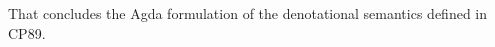 \begin{AgdaAlign}
\begin{code}
\AgdaSpace{}%
\AgdaSpace{}%
\AgdaSymbol{)}\AgdaSpace{}%
\AgdaOperator{\AgdaFunction{]?}}\AgdaSpace{}%
\AgdaSymbol{(}\AgdaSpace{}%
\AgdaSpace{}%
\AgdaSymbol{)}\<%
\\
%
\\[\AgdaEmptyExtraSkip]%
%
\>[2]\AgdaSpace{}%
\AgdaSymbol{:}\AgdaSpace{}%
\AgdaSpace{}%
\AgdaSpace{}%
\<%
\\
%
\>[2]\AgdaSpace{}%
\AgdaSymbol{(}\AgdaSpace{}%
\AgdaSpace{}%
\AgdaSymbol{)}%
\>[19]\AgdaSymbol{=}\AgdaSpace{}%
\AgdaSpace{}%
\AgdaSymbol{(}\AgdaSpace{}%
\AgdaSpace{}%
\AgdaSymbol{)}\AgdaSpace{}%
\AgdaSpace{}%
\AgdaSpace{}%
\<%
\\
%
\>[2]\AgdaSpace{}%
%
\>[19]\AgdaSymbol{=}\AgdaSpace{}%
\AgdaSpace{}%
\AgdaSpace{}%
\AgdaSpace{}%
\<%
\\
%
\\[\AgdaEmptyExtraSkip]%
%
\>[2]\AgdaSpace{}%
\AgdaSymbol{:}\AgdaSpace{}%
\AgdaSpace{}%
\AgdaSpace{}%
\AgdaSpace{}%
\AgdaSpace{}%
\<%
\\
%
\>[2]\AgdaSpace{}%
\AgdaSpace{}%
\AgdaSymbol{=}\AgdaSpace{}%
\AgdaSpace{}%
\AgdaSymbol{(}\AgdaSpace{}%
\AgdaSymbol{(}\AgdaSpace{}%
\AgdaSymbol{))}\<%
\end{code}
\end{AgdaAlign}
%
That concludes the Agda formulation of the denotational semantics defined in CP89.